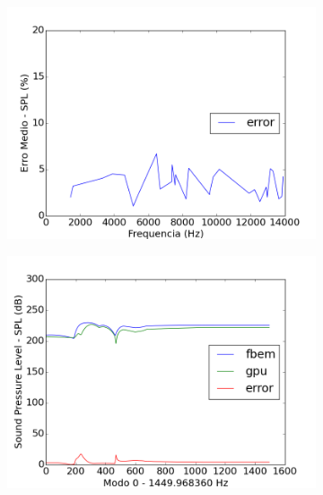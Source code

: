 \begin{figure}[ht]
\centering
\begin{subfigure}{0.6\textwidth}
	\centering
	\includegraphics[width=\textwidth]{../data/transfer_test/ceramic_mug/plots/ceramic_mug_error.png}
	\caption{}
	\label{fig:coef_mug_err}
\end{subfigure}
\begin{subfigure}{0.45\textwidth}
	\centering
	\includegraphics[width=\textwidth]{../data/transfer_test/ceramic_mug/plots/ceramic_mug-tfv-0_0.png}
	\caption{}
	\label{fig:coef_mug_0}
\end{subfigure}%
\begin{subfigure}{0.45\textwidth}
	\centering

\end{subfigure}
\end{figure}
